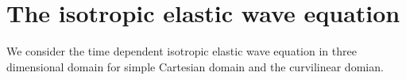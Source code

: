 \section{The isotropic elastic wave equation }
We consider the time dependent isotropic elastic wave equation in three dimensional domain for simple Cartesian domain and the curvilinear domian.